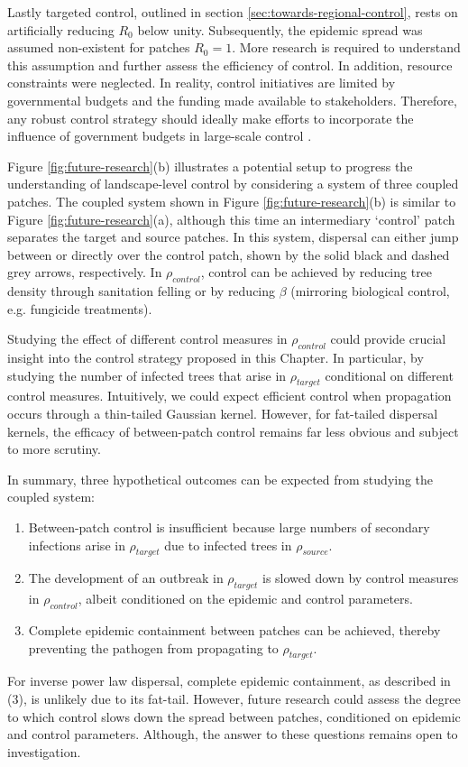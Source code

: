 Lastly targeted control, outlined in section \ref{sec:towards-regional-control}, rests on artificially reducing $R_0$ below unity.
Subsequently, the epidemic spread was assumed non-existent for patches $R_0=1$.
More research is required to understand this assumption and further assess the efficiency of control.
In addition, resource constraints were neglected. In reality, control initiatives are limited by governmental budgets and the funding made available to stakeholders.
Therefore, any robust control strategy should ideally make efforts to incorporate the influence of government budgets in large-scale control \cite{large-scale-control}.

Figure \ref{fig:future-research}(b) illustrates a potential setup to progress the understanding of landscape-level control by considering a system of three coupled patches.
The coupled system shown in Figure \ref{fig:future-research}(b) is similar to Figure \ref{fig:future-research}(a), although this time an intermediary `control' patch separates the target and source patches. In this system, dispersal can either jump between or directly over the control patch, shown by the solid black and dashed grey arrows, respectively. In $\rho_{control}$, control can be achieved by reducing tree density through sanitation felling or by reducing $\beta$ (mirroring biological control, e.g. fungicide treatments).

Studying the effect of different control measures in $\rho_{control}$ could provide crucial insight into the control strategy proposed in this Chapter.
In particular, by studying the number of infected trees that arise in $\rho_{target}$ conditional on different control measures. 
Intuitively, we could expect efficient control when propagation occurs through a thin-tailed Gaussian kernel.
However, for fat-tailed dispersal kernels, the efficacy of between-patch control remains far less obvious and subject to more scrutiny.

In summary, three hypothetical outcomes can be expected from studying the coupled system: 
\begin{enumerate}
    \item Between-patch control is insufficient because large numbers of secondary infections arise in $\rho_{target}$ due to infected trees in $\rho_{source}$.
    \item The development of an outbreak in $\rho_{target}$ is slowed down by control measures in $\rho_{control}$, albeit conditioned on the epidemic and control parameters.
    \item Complete epidemic containment between patches can be achieved, thereby preventing the pathogen from propagating to $\rho_{target}$.
\end{enumerate}
For inverse power law dispersal, complete epidemic containment, as described in (3), is unlikely due to its fat-tail.
However, future research could assess the degree to which control slows down the spread between patches, conditioned on epidemic and control parameters. Although, the answer to these questions remains open to investigation.

\newpage












